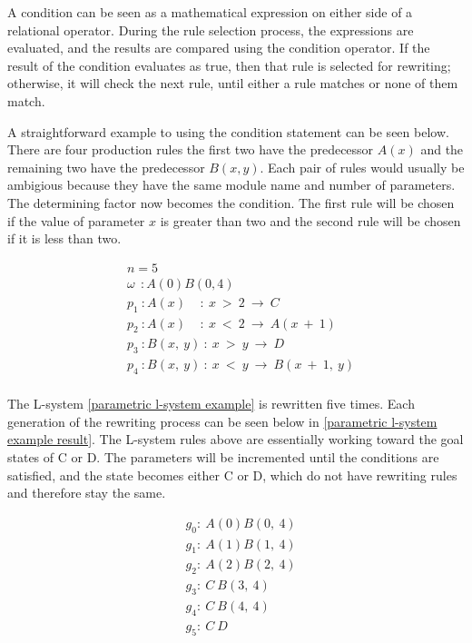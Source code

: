\newpage
\noindent
A condition can be seen as a mathematical expression on either side of a relational operator. During the rule selection process, the expressions are evaluated, and the results are compared using the condition operator. If the result of the condition evaluates as true, then that rule is selected for rewriting; otherwise, it will check the next rule, until either a rule matches or none of them match. 

A straightforward example to using the condition statement can be seen below. There are four production rules the first two have the predecessor $A(x)$ and the remaining two have the predecessor $B(x, y)$. Each pair of rules would usually be ambigious because they have the same module name and number of parameters. The determining factor now becomes the condition. The first rule will be chosen if the value of parameter $x$ is greater than two and the second rule will be chosen if it is less than two.

\begin{singlespace}
\begin{equation} \label{parametric l-system example}
\begin{aligned}
	&n=5 \\
	&\omega~~ : A(0)B(0,4)\\
	&p_1~ :  A(x)~~~~~ :~ x~ >~ 2~ \rightarrow~ C\\
	&p_2~ :  A(x)~~~~~ :~ x~ <~ 2~ \rightarrow~ A(x~ +~ 1)\\
	&p_3~ :  B(x,~ y)~ :~ x~ >~ y~ \rightarrow~ D\\
	&p_4~ :  B(x,~ y)~ :~ x~ <~ y~ \rightarrow~ B(x~ +~ 1,~ y)\\
\end{aligned}
\end{equation}
\end{singlespace}

\vspace{5mm}
\noindent
The L-system \ref{parametric l-system example} is rewritten five times. Each generation of the rewriting process can be seen below in \ref{parametric l-system example result}. The L-system rules above are essentially working toward the goal states of C or D. The parameters will be incremented until the conditions are satisfied, and the state becomes either C or D, which do not have rewriting rules and therefore stay the same.

\begin{singlespace}
\begin{equation} \label{parametric l-system example result}
\begin{aligned}
	&g_0 :~ A(0)B(0,~4)\\
	&g_1 :~ A(1)B(1,~4)\\
	&g_2 :~ A(2)B(2,~4)\\
	&g_3 :~ C~B(3,~4)\\
	&g_4 :~ C~B(4,~4)\\
	&g_5 :~ C~D\\
\end{aligned}
\end{equation}
\end{singlespace}

